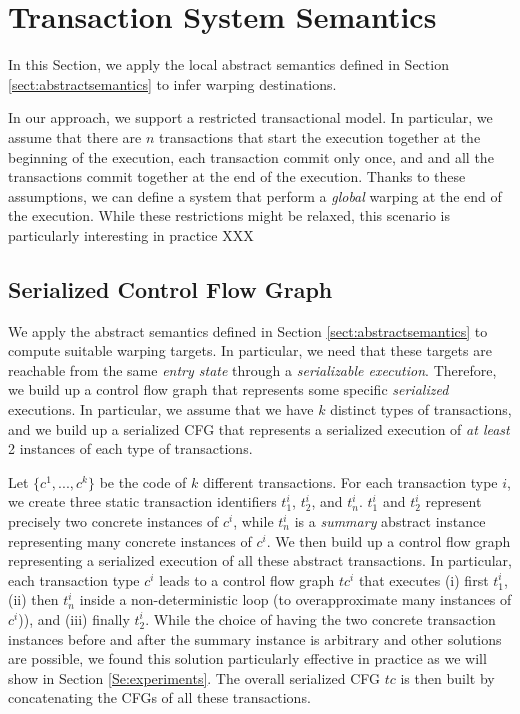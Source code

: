 \section{Transaction System Semantics}
\label{sec:transactionsystemwarping}
In this Section, we apply the local abstract semantics defined in Section \ref{sect:abstractsemantics} to infer warping destinations.

In our approach, we support a restricted transactional model. In particular, we assume that there are $n$ transactions that start the execution together at the beginning of the execution, each transaction commit only once, and and all the transactions commit together at the end of the execution. Thanks to these assumptions, we can define a system that perform a \emph{global} warping at the end of the execution. While these restrictions might be relaxed, this scenario is particularly interesting in practice XXX


\subsection{Serialized Control Flow Graph}
\label{Se:concabs}
We apply the abstract semantics defined in Section \ref{sect:abstractsemantics} to compute suitable warping targets. In particular, we need that these targets are reachable from the same \emph{entry state} through a \emph{serializable execution}. Therefore, we build up a control flow graph that represents some specific \emph{serialized} executions. In particular, we assume that we have $k$ distinct types of transactions, and we build up a serialized CFG that represents a serialized execution of \emph{at least} 2 instances of each type of transactions.

Let $\{c^1, ..., c^k\}$ be the code of $k$ different transactions. For each transaction type $i$, we create three static transaction identifiers $t^i_1$, $t^i_2$, and $t^i_n$. $t^i_1$ and $t^i_2$ represent precisely two concrete instances of $c^i$, while $t^i_n$ is a \emph{summary} abstract instance representing many concrete instances of $c^i$. We then build up a control flow graph representing a serialized execution of all these abstract transactions. In particular, each transaction type $c^i$ leads to a control flow graph $tc^i$ that executes (i) first $t^i_1$, (ii) then $t^i_n$ inside a non-deterministic loop (to overapproximate many instances of $c^i$)), and (iii) finally $t^i_2$. While the choice of having the two concrete transaction instances before and after the summary instance is arbitrary and other solutions are possible, we found this solution particularly effective in practice as we will show in Section \ref{Se:experiments}. The overall serialized CFG $tc$ is then built by concatenating the CFGs of all these transactions.

